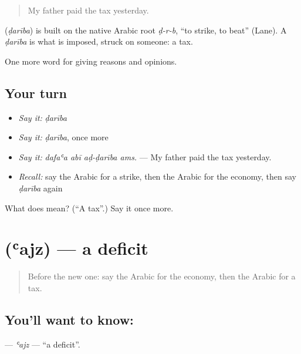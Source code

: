 \begin{quote}
My father paid the tax yesterday.
\end{quote}

\begin{cousinweb}
\textbf{} (\emph{ḍarība}) is built on the native Arabic root \emph{ḍ-r-b}, \textquotedblleft{}to strike, to beat\textquotedblright{} (Lane). A \emph{ḍarība} is what is imposed, struck on someone: a tax.
\end{cousinweb}

\begin{grammarlens}[title={What you've built}]
One more word for giving reasons and opinions.
\end{grammarlens}

\subsection*{Your turn}
\begin{itemize}
\raggedright
  \item \emph{Say it:} \emph{ḍarība}
  \item \emph{Say it:} \emph{ḍarība}, once more
  \item \emph{Say it:} \emph{dafaʿa abī aḍ-ḍarība ams.} — My father paid the tax yesterday.
  \item \emph{Recall:} say the Arabic for a strike, then the Arabic for the economy, then say \emph{ḍarība} again
\end{itemize}

\begin{tcolorbox}[breakable,colback=teal!4,colframe=teal!35!black,title={Before you move on}]
What does  mean? (\textquotedblleft{}A tax\textquotedblright{}.) Say it once more.
\end{tcolorbox}
\section[\texorpdfstring{\ar{عجز} (ʿajz)}{عجز (ʿajz)}]{ (ʿajz) — a deficit}

\label{lesson:AR-C383-ajz}



\begin{quote}
Before the new one: say the Arabic for the economy, then the Arabic for a tax.
\end{quote}

\subsection*{You'll want to know: }
\textbf{} — \emph{ʿajz} — \textquotedblleft{}a deficit\textquotedblright{}.

